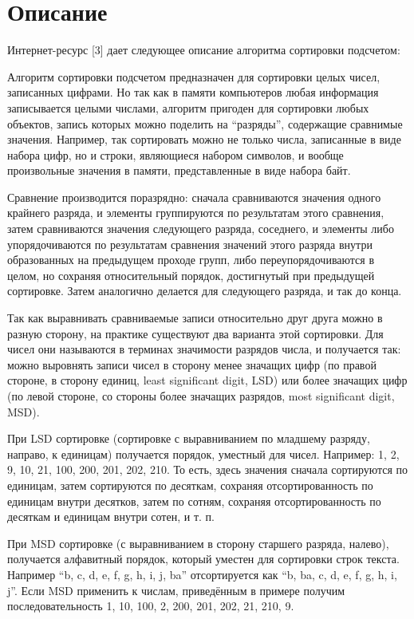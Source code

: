 \documentclass[pdf, unicode, 12pt, a4paper,oneside,fleqn]{article}
\begin{document}
\section{Описание}

Интернет-ресурс [3] дает следующее описание алгоритма сортировки подсчетом:


Алгоритм сортировки подсчетом предназначен для сортировки целых чисел, записанных цифрами. Но так как в памяти компьютеров любая информация записывается целыми числами, алгоритм пригоден для сортировки любых объектов, запись которых можно поделить на \enquote{разряды}, содержащие сравнимые значения. Например, так сортировать можно не только числа, записанные в виде набора цифр, но и строки, являющиеся набором символов, и вообще произвольные значения в памяти, представленные в виде набора байт.

Сравнение производится поразрядно: сначала сравниваются значения одного крайнего разряда, и элементы группируются по результатам этого сравнения, затем сравниваются значения следующего разряда, соседнего, и элементы либо упорядочиваются по результатам сравнения значений этого разряда внутри образованных на предыдущем проходе групп, либо переупорядочиваются в целом, но сохраняя относительный порядок, достигнутый при предыдущей сортировке. Затем аналогично делается для следующего разряда, и так до конца.

Так как выравнивать сравниваемые записи относительно друг друга можно в разную сторону, на практике существуют два варианта этой сортировки. Для чисел они называются в терминах значимости разрядов числа, и получается так: можно выровнять записи чисел в сторону менее значащих цифр (по правой стороне, в сторону единиц, least significant digit, LSD) или более значащих цифр (по левой стороне, со стороны более значащих разрядов, most significant digit, MSD).

При LSD сортировке (сортировке с выравниванием по младшему разряду, направо, к единицам) получается порядок, уместный для чисел. Например: 1, 2, 9, 10, 21, 100, 200, 201, 202, 210. То есть, здесь значения сначала сортируются по единицам, затем сортируются по десяткам, сохраняя отсортированность по единицам внутри десятков, затем по сотням, сохраняя отсортированность по десяткам и единицам внутри сотен, и т. п.

При MSD сортировке (с выравниванием в сторону старшего разряда, налево), получается алфавитный порядок, который уместен для сортировки строк текста. Например \enquote{b, c, d, e, f, g, h, i, j, ba} отсортируется как \enquote{b, ba, c, d, e, f, g, h, i, j}. Если MSD применить к числам, приведённым в примере получим последовательность 1, 10, 100, 2, 200, 201, 202, 21, 210, 9.
\end{document}
